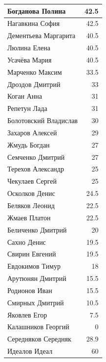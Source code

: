\documentclass[12pt]{article}
\newlength{\h}
\begin{document}
\begin{table}[ht]
\begin{minipage}[t]{0.48\linewidth}
\begin{tabular}{|l|r|}
      \hline
      Богданова Полина       &   42.5  \\
      \hline
      Нагавкина София        &   42.5  \\
      \hline
      Дементьева Маргарита   &   40.5  \\
      \hline
      Люлина Елена           &   40.5  \\
      \hline
      Усачёва Мария          &   40.5  \\
      \hline
      Марченко Максим        &   33.5  \\
      \hline
      Дроздов Дмитрий        &    33  \\
      \hline
      Коган Анна             &    31  \\
      \hline
      Репетун Лада           &    31  \\
      \hline
      Болотовский Владислав  &    30  \\
      \hline
      Захаров Алексей        &    29  \\
      \hline
      Жмудь Богдан           &     27  \\
      \hline
      Семченко Дмитрий       &     27  \\
      \hline
      Терехов Александр      &    25  \\
      \hline
      Чекулаев Сергей        &    25  \\
      \hline
      Осколков Денис         &   24.5  \\
      \hline
      Беляков Леонид         &   22.5  \\
      \hline
      Жмаев Платон           &   22.5  \\
      \hline
      Беличенко Дмитрий      &    20  \\
      \hline
      Сахно Денис            &   19.5  \\
      \hline
      Свирин Евгений         &   19.5  \\
      \hline
      Евдокимов Тимур        &    18  \\
      \hline
      Арутюнян Дмитрий       &   15.5  \\
      \hline
      Родионов Иван          &   15.5  \\
      \hline
      Смирных Дмитрий        &   10.5  \\
      \hline
      Яковлев Егор           &    7.5  \\
      \hline
      Калашников Георгий     &      0  \\
      \hline
      Середняков Середняк    &   28.9  \\
      Идеалов Идеал          &     60  \\
      \hline
    \end{tabular}
  \end{minipage}
\end{table}
\end{document}
